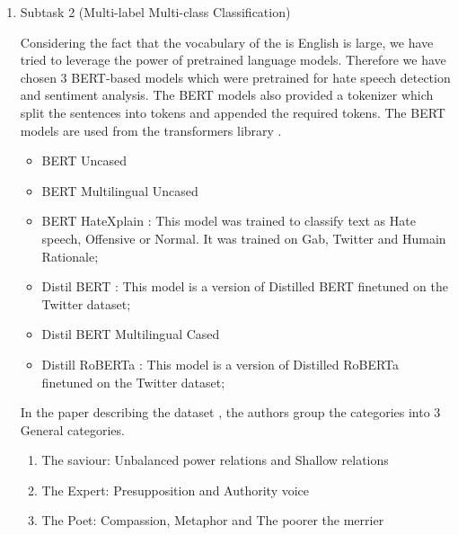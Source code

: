 \documentclass[11pt]{article}
\begin{document}
\begin{enumerate}
	\item Subtask 2 (Multi-label Multi-class Classification)

	      Considering the fact that the vocabulary of the is English is large,
	      we have tried to leverage the power of pretrained language models.
	      Therefore we have chosen 3 BERT-based models which were pretrained
	      for hate speech detection and sentiment analysis. The BERT models
	      also provided a tokenizer which split the sentences into tokens and
	      appended the required tokens. The BERT models are used from the
	      transformers library \cite{huggingface}.

	      \begin{itemize}
		      \item BERT \cite{bert} Uncased

		      \item  BERT Multilingual Uncased

		      \item BERT HateXplain \cite{mathew2020hatexplain}: This model was
		            trained to classify text as Hate speech, Offensive or Normal.
		            It was trained on Gab, Twitter and Humain Rationale;

		      \item Distil BERT : This model is a version of Distilled BERT
		            finetuned on the Twitter dataset;

		      \item Distil BERT Multilingual Cased \cite{DistilBERT}

		      \item Distill RoBERTa : This model is a version of Distilled
		            RoBERTa finetuned on the Twitter dataset;
	      \end{itemize}

	      In the paper describing the dataset \cite{perezalmendros2020dont},
	      the authors group the categories into 3 General categories.

	      \begin{enumerate}
		      \item The saviour: Unbalanced power relations and Shallow relations

		      \item The Expert: Presupposition and Authority voice

		      \item The Poet: Compassion, Metaphor and The poorer the merrier

	      \end{enumerate}


\end{enumerate}
\end{document}
